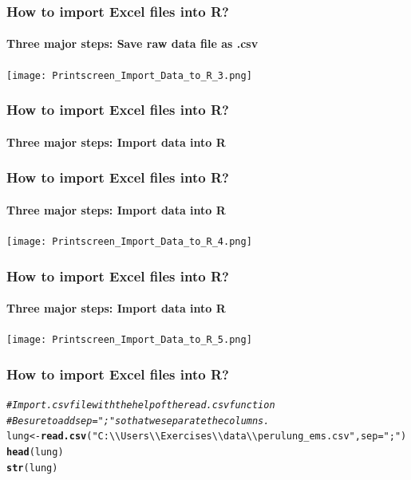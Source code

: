 \documentclass{beamer}\usepackage[]{graphicx}\usepackage[]{color}
\makeatletter
\newcommand{\hlstr}[1]{\textcolor[rgb]{0.192,0.494,0.8}{#1}}%
\newcommand{\hlcom}[1]{\textcolor[rgb]{0.678,0.584,0.686}{\textit{#1}}}%
\newcommand{\hlstd}[1]{\textcolor[rgb]{0.345,0.345,0.345}{#1}}%
\newcommand{\hlkwb}[1]{\textcolor[rgb]{0.69,0.353,0.396}{#1}}%
\newcommand{\hlkwc}[1]{\textcolor[rgb]{0.333,0.667,0.333}{#1}}%
\newcommand{\hlkwd}[1]{\textcolor[rgb]{0.737,0.353,0.396}{\textbf{#1}}}%
\newenvironment{kframe}{%
 \def\at@end@of@kframe{}%
 \ifinner\ifhmode%
  \def\at@end@of@kframe{\end{minipage}}%
  \begin{minipage}{\columnwidth}%
 \fi\fi%
 \def\FrameCommand##1{\hskip\@totalleftmargin \hskip-\fboxsep
 \colorbox{shadecolor}{##1}\hskip-\fboxsep
     \hskip-\linewidth \hskip-\@totalleftmargin \hskip\columnwidth}%
 \MakeFramed {\advance\hsize-\width
   \@totalleftmargin\z@ \linewidth\hsize
   \@setminipage}}%
 {\par\unskip\endMakeFramed%
 \at@end@of@kframe}
\newenvironment{knitrout}{}{} %
\makeatother
\begin{document}
{{{%

\begin{frame}[fragile]
\frametitle{How to import Excel files into R?}
\framesubtitle{Three major steps: Save raw data file as .csv}
\begin{center}
\texttt{[image: Printscreen\_Import\_Data\_to\_R\_3.png]}
\end{center}
\end{frame}


\begin{frame}[fragile]
\frametitle{How to import Excel files into R?}
\framesubtitle{Three major steps: Import data into R}
\end{frame}


\begin{frame}[fragile]
\frametitle{How to import Excel files into R?}
\framesubtitle{Three major steps: Import data into R}
\begin{center}
\texttt{[image: Printscreen\_Import\_Data\_to\_R\_4.png]}
\end{center}
\end{frame}


\begin{frame}[fragile]
\frametitle{How to import Excel files into R?}
\framesubtitle{Three major steps: Import data into R}
\begin{center}
\texttt{[image: Printscreen\_Import\_Data\_to\_R\_5.png]}
\end{center}
\end{frame}



\begin{frame}[fragile]
\frametitle{How to import Excel files into R?}
\begin{knitrout}\scriptsize
{}\color{fgcolor}\begin{kframe}
\begin{alltt}
\hlcom{# Import .csv file with the help of the read.csv function}
\hlcom{# Be sure to add sep = ";" so that we separate the columns.}
\hlstd{lung} \hlkwb{<-} \hlkwd{read.csv}\hlstd{(}\hlstr{"C:\textbackslash{}\textbackslash{}Users\textbackslash{}\textbackslash{}Exercises\textbackslash{}\textbackslash{}data\textbackslash{}\textbackslash{}perulung_ems.csv"}\hlstd{,} \hlkwc{sep} \hlstd{=} \hlstr{";"}\hlstd{)}
\hlkwd{head}\hlstd{(lung)}
\hlkwd{str}\hlstd{(lung)}
\end{alltt}
\end{kframe}
\end{knitrout}


\end{frame}}}}
\end{document}
